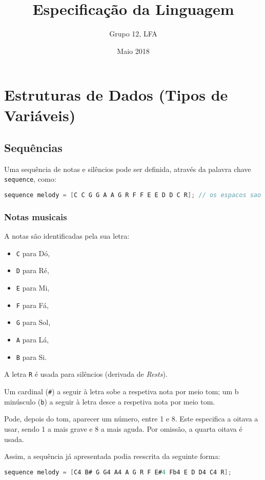 \documentclass{article}
\title{Especificação da Linguagem}
\author{Grupo 12, LFA}
\date{Maio 2018}
\begin{document}
\maketitle

\tableofcontents
\vspace{2cm} %

\section{Estruturas de Dados (Tipos de Variáveis)} \label{variables}
\subsection{Sequências}
Uma sequência de notas e silêncios pode ser definida, através da palavra chave \texttt{sequence}, como:
\begin{lstlisting}[language=C]
sequence melody = [C C G G A A G R F F E E D D C R]; // os espacos sao opcionais
\end{lstlisting}

\subsubsection{Notas musicais}
A notas são identificadas pela sua letra:
\begin{itemize}
    \item \texttt{C} para Dó,
    \item \texttt{D} para Ré,
    \item \texttt{E} para Mi,
    \item \texttt{F} para Fá,
    \item \texttt{G} para Sol,
    \item \texttt{A} para Lá,
    \item \texttt{B} para Si.
\end{itemize}
A letra \texttt{R} é usada para silêncios (derivada de \textit{Rests}).

Um cardinal (\texttt{\#}) a seguir à letra sobe a respetiva nota por meio tom; um b minúsculo (\texttt{b}) a seguir à letra desce a respetiva nota por meio tom.


Pode, depois do tom, aparecer um número, entre 1 e 8. Este especifica a oitava a usar, sendo 1 a mais grave e 8 a mais aguda. Por omissão, a quarta oitava é usada.

Assim, a sequência já apresentada podia reescrita da seguinte forma:
\begin{lstlisting}[language=C]
sequence melody = [C4 B# G G4 A4 A G R F E#4 Fb4 E D D4 C4 R];
\end{lstlisting}
\end{document}
